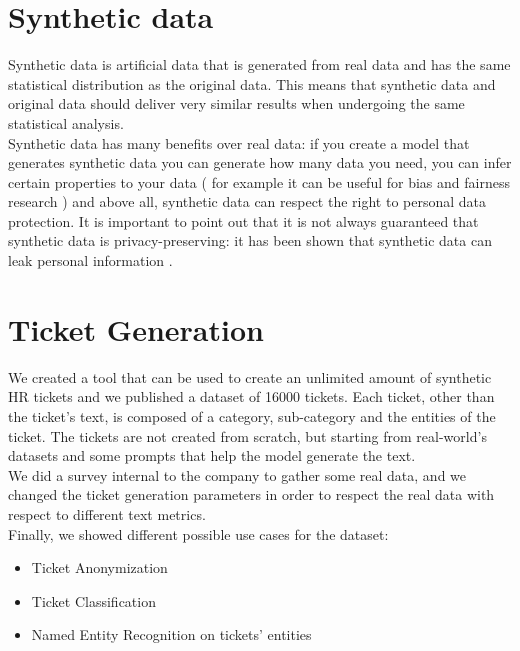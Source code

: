 \section{Synthetic data}
Synthetic data is artificial data that is generated from real data and has the same statistical distribution as the original data. This means that synthetic data and original data should deliver very similar results when undergoing the same statistical analysis. \\
Synthetic data has many benefits over real data: if you create a model that generates synthetic data you can generate how many data you need, you can infer certain properties to your data ( for example it can be useful for bias and fairness research ) and above all, synthetic data can respect the right to personal data protection. It is important to point out that it is not always guaranteed that synthetic data is privacy-preserving: it has been shown that synthetic data can leak personal information \cite{bellovin2019privacy}.\\

\section{Ticket Generation}
We created a tool that can be used to create an unlimited amount of synthetic HR tickets and we published a dataset of 16000 tickets. Each ticket, other than the ticket's text, is composed of a category, sub-category and the entities of the ticket. The tickets are not created from scratch, but starting from real-world's datasets and some prompts that help the model generate the text. \\
We did a survey internal to the company to gather some real data, and we changed the ticket generation parameters in order to respect the real data with respect to different text metrics. \\
Finally, we showed different possible use cases for the dataset:
\begin{itemize}
    \item Ticket Anonymization
    \item Ticket Classification
    \item Named Entity Recognition on tickets' entities
\end{itemize}